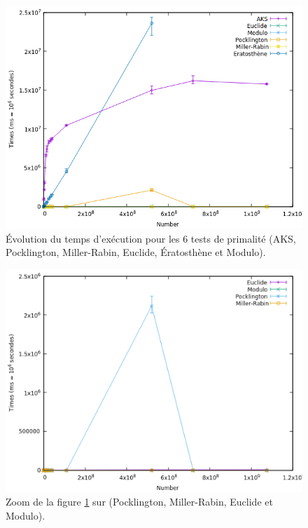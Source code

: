\begin{frame}
\begin{figure}[!ht]	
		\begin{center}\includegraphics[scale=0.55]{result.png}\end{center}
		\caption{Évolution du temps d'exécution pour les 6 tests de primalité (AKS, Pocklington, Miller-Rabin, Euclide, Ératosthène et Modulo). }
		\label{fg:fig1}
\end{figure}
\end{frame}

\begin{frame}
\begin{figure}[!ht]	
		\begin{center}\includegraphics[scale=0.5]{Zoom1.png}\end{center}
		\caption{Zoom de la figure \ref{fg:fig1} sur (Pocklington, Miller-Rabin, Euclide et Modulo).}
		\label{fg:fig2}
\end{figure}
\end{frame}
		
